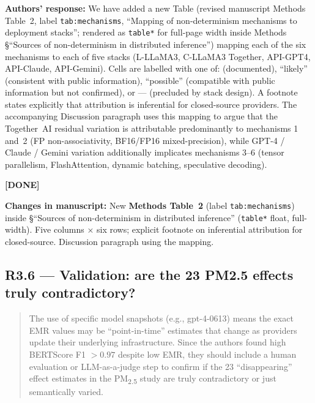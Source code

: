 \documentclass[11pt,a4paper]{article}
\newenvironment{revquote}{%
  \begin{quote}\small\itshape\color{revgray}
}{%
  \end{quote}
}
\newcommand{\response}[1]{\par\noindent\textbf{\color{revgreen}Authors' response:} #1\par}
\newcommand{\changes}[1]{\par\noindent\textbf{\color{revblue}Changes in manuscript:} #1\par}
\newcommand{\done}{\color{revgreen}\textbf{[DONE]}}
\begin{document}
\response{We have added a new Table (revised manuscript Methods Table~2, label \texttt{tab:mechanisms}, ``Mapping of non-determinism mechanisms to deployment stacks''; rendered as \texttt{table*} for full-page width inside Methods §``Sources of non-determinism in distributed inference'') mapping each of the six mechanisms to each of five stacks (L-LLaMA3, C-LLaMA3 Together, API-GPT4, API-Claude, API-Gemini). Cells are labelled with one of: \checkmark (documented), ``likely'' (consistent with public information), ``possible'' (compatible with public information but not confirmed), or --- (precluded by stack design). A footnote states explicitly that attribution is inferential for closed-source providers. The accompanying Discussion paragraph uses this mapping to argue that the Together~AI residual variation is attributable predominantly to mechanisms 1 and~2 (FP non-associativity, BF16/FP16 mixed-precision), while GPT-4 / Claude / Gemini variation additionally implicates mechanisms 3--6 (tensor parallelism, FlashAttention, dynamic batching, speculative decoding).} \done

\changes{New \textbf{Methods Table~2} (label \texttt{tab:mechanisms}) inside §``Sources of non-determinism in distributed inference'' (\texttt{table*} float, full-width). Five columns × six rows; explicit footnote on inferential attribution for closed-source. Discussion paragraph using the mapping.}

\subsection*{R3.6 --- Validation: are the 23 PM2.5 effects truly contradictory?}

\begin{revquote}
The use of specific model snapshots (e.g., gpt-4-0613) means the exact EMR values may be ``point-in-time'' estimates that change as providers update their underlying infrastructure. Since the authors found high BERTScore F1 $>0.97$ despite low EMR, they should include a human evaluation or LLM-as-a-judge step to confirm if the 23 ``disappearing'' effect estimates in the PM\textsubscript{2.5} study are truly contradictory or just semantically varied.
\end{revquote}
\end{document}
